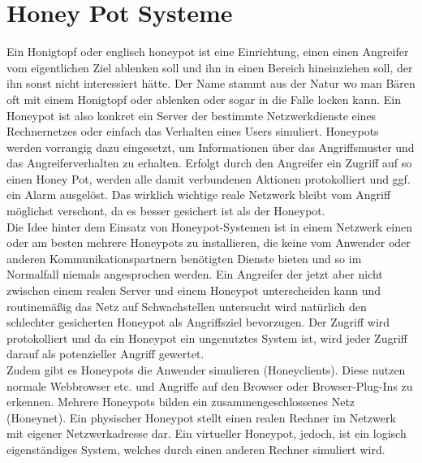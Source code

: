 \documentclass[11pt]{scrartcl}
\begin{document}
\section{Honey Pot Systeme}
\label{sec:honey pot systems}
Ein Honigtopf oder englisch honeypot ist eine Einrichtung, einen einen Angreifer vom eigentlichen Ziel ablenken soll und ihn in einen Bereich hineinziehen soll, der ihn sonst nicht interessiert hätte. Der Name stammt aus der Natur wo man Bären oft mit einem Honigtopf oder ablenken oder sogar in die Falle locken kann.
Ein Honeypot ist also konkret ein Server der bestimmte Netzwerkdienste eines Rechnernetzes oder einfach das Verhalten eines Users simuliert. Honeypots werden vorrangig dazu eingesetzt, um Informationen über das Angriffsmuster und das Angreiferverhalten zu erhalten. Erfolgt durch den Angreifer ein Zugriff auf so einen Honey Pot, werden alle damit verbundenen Aktionen protokolliert und ggf. ein Alarm ausgelöst. Das wirklich wichtige reale Netzwerk bleibt vom Angriff möglichst verschont, da es besser gesichert ist als der Honeypot.\\

Die Idee hinter dem Einsatz von Honeypot-Systemen ist in einem Netzwerk einen oder am besten mehrere Honeypots zu installieren, die keine vom Anwender oder anderen Kommunikationspartnern benötigten Dienste bieten und so im Normalfall niemals angesprochen werden. Ein Angreifer der jetzt aber nicht zwischen einem realen Server und einem Honeypot unterscheiden kann und routinemäßig das Netz auf Schwachstellen untersucht wird natürlich den schlechter gesicherten Honeypot als Angriffsziel bevorzugen. Der Zugriff wird protokolliert und da ein Honeypot ein ungenutztes System ist, wird jeder Zugriff darauf als potenzieller Angriff gewertet.\\

Zudem gibt es Honeypots die Anwender simulieren (Honeyclients). Diese nutzen normale Webbrowser etc. und Angriffe auf den Browser oder Browser-Plug-Ins zu erkennen. Mehrere   Honeypots bilden ein zusammengeschlossenes Netz (Honeynet).
Ein physischer Honeypot stellt einen realen Rechner im Netzwerk mit eigener Netzwerkadresse dar. Ein virtueller Honeypot, jedoch, ist ein logisch eigenständiges System, welches durch einen anderen Rechner simuliert wird. \cite{10} \cite{11}
\end{document}
